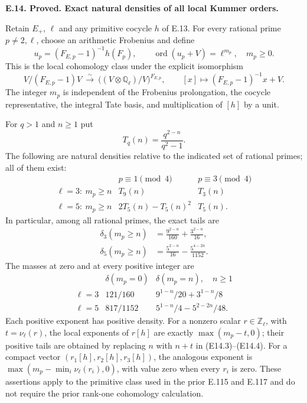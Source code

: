 \documentclass[11pt,oneside]{article}
\makeatletter
\newcounter{statementanchor}
\newenvironment{statement}[3]{%
 \refstepcounter{statementanchor}\def\@currentlabel{#1}%
 \par\addvspace{9pt}\noindent
 \textbf{#1. #2. #3.}\par\nobreak\noindent\ignorespaces
}{\par\addvspace{5pt}}
\makeatother
\begin{document}
\begin{statement}{E.14}{Proved}{Exact natural densities of all local Kummer orders}
\label{st:E.14}

Retain $E_+$, $\ell$ and any primitive cocycle $h$ of E.13.
For every rational prime $p\ne2,\ell$, choose an arithmetic
Frobenius and define
\[
 u_p=(F_{E,p}-1)^{-1}h(F_p),\qquad
 \operatorname{ord}(u_p+V)=\ell^{m_p},\quad m_p\ge0.
 \tag{E14.1}
\]
This is the local cohomology class under the explicit isomorphism
\[
 V/(F_{E,p}-1)V\ \xrightarrow{\sim}\
 \bigl((V\otimes\mathbb Q_\ell)/V\bigr)^{F_{E,p}},
 \qquad [x]\longmapsto(F_{E,p}-1)^{-1}x+V.
 \tag{E14.2}
\]
The integer $m_p$ is independent of the Frobenius prolongation,
the cocycle representative, the integral Tate basis, and
multiplication of $[h]$ by a unit.

For $q>1$ and $n\ge1$ put
\[
             T_q(n)=\frac{q^{2-n}}{q^2-1}.
\]
The following are natural densities relative to the indicated
set of rational primes; all of them exist:
\[
\begin{array}{c|cc}
 &p\equiv1\pmod4&p\equiv3\pmod4\\\hline
 \ell=3:\ m_p\ge n&T_9(n)&T_3(n)\\
 \ell=5:\ m_p\ge n&2T_5(n)-T_5(n)^2&T_5(n).
\end{array}
 \tag{E14.3}
\]
In particular, among all rational primes, the exact tails are
\[
\begin{split}
 \delta_3(m_p\ge n)&=\frac{9^{2-n}}{160}
                         +\frac{3^{2-n}}{16},\\
 \delta_5(m_p\ge n)&=\frac{5^{2-n}}{16}
                         -\frac{5^{4-2n}}{1152}.
\end{split}
 \tag{E14.4}
\]
The masses at zero and at every positive integer are
\[
\begin{array}{c|cc}
 &\delta(m_p=0)&\delta(m_p=n),\quad n\ge1\\\hline
 \ell=3&121/160&9^{1-n}/20+3^{1-n}/8\\
 \ell=5&817/1152&5^{1-n}/4-5^{2-2n}/48.
\end{array}
 \tag{E14.5}
\]
Each positive exponent has positive density.  For a nonzero scalar
$r\in\mathbb Z_\ell$, with $t=\nu_\ell(r)$, the local exponents
of $r[h]$ are exactly $\max(m_p-t,0)$; their positive tails are
obtained by replacing $n$ with $n+t$ in (E14.3)--(E14.4).
For a compact vector $(r_1[h],r_2[h],r_3[h])$, the analogous
exponent is $\max(m_p-\min_i\nu_\ell(r_i),0)$, with value zero
when every $r_i$ is zero.  These assertions apply to the primitive
class used in the prior E.115 and E.117 and do not require the
prior rank-one cohomology calculation.
\end{statement}
\end{document}
